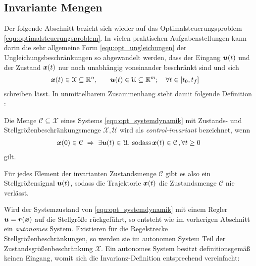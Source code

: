 \subsection{Invariante Mengen} \label{sec:invariantSets}
Der folgende Abschnitt bezieht sich wieder auf das Optimalsteuerungsproblem \eqref{equ:optimalsteuerungsproblem}. 
In vielen praktischen Aufgabenstellungen kann darin die sehr allgemeine Form \eqref{equ:opt_ungleichungen} der Ungleichungsbeschränkungen so abgewandelt werden, dass der Eingang $\boldsymbol{u}(t)$ und der Zustand $\boldsymbol{x}(t)$ nur noch unabhängig voneinander beschränkt sind und sich
\begin{alignat*}{2}
	{\bs x}(t) &\in \mathcal X \subseteq \mathbb R^n, & \quad {\bs u}(t) \in \mathcal U \subseteq \mathbb R^m; \quad \forall t &\in [t_0, t_f] %
\end{alignat*}
schreiben lässt. %
In unmittelbarem Zusammenhang steht damit folgende Definition \cite{borrelli2014predictive}:

\begin{mydef}
Die Menge $\mathcal C \subseteq \mathcal X$ eines Systems \eqref{equ:opt_systemdynamik} mit Zustands- und Stellgrößenbeschränkungsmenge $\mathcal X, \mathcal U$ wird  als \emph{control-invariant} bezeichnet, wenn
\begin{align*}
	\boldsymbol{x}(0) \in \mathcal C \,\,  \Rightarrow \,\,  \exists \boldsymbol{u}(t) \in \mathcal U, \,\text{sodass} \, \boldsymbol{x}(t) \in \mathcal C \, ,\forall t \geq 0 
\end{align*}
gilt.
\end{mydef}
Für jedes Element der invarianten Zustandsmenge $\mathcal C$ gibt es also ein Stellgrößensignal $\boldsymbol{u}(t)$, sodass die Trajektorie $\boldsymbol{x}(t)$ die Zustandsmenge $\mathcal C$ nie verlässt.

Wird der Systemzustand von \eqref{equ:opt_systemdynamik} mit einem Regler $\boldsymbol{u} = \boldsymbol{r}(\boldsymbol{x})$ auf die Stellgröße rückgeführt, so entsteht wie im vorherigen Abschnitt ein \emph{autonomes} System. Existieren für die Regelstrecke Stellgrößenbeschränkungen, so werden sie im autonomen System Teil der Zustandsgrößenbeschränkung $\mathcal X$.
Ein autonomes System besitzt definitionsgemäß keinen Eingang, womit sich die Invarianz-Definition \cite{borrelli2014predictive} entsprechend vereinfacht:

